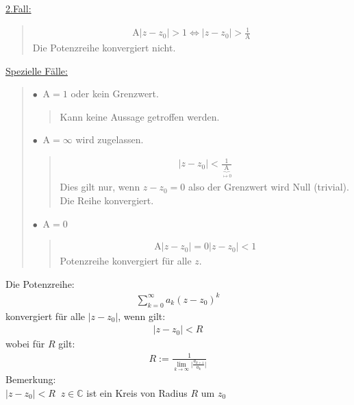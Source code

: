 \underline{2.Fall:}\\
\begin{quote}
	\begin{align*}
		\mathrm{A}|z-z_0|>1\Leftrightarrow |z-z_0|>\frac{1}{\mathrm{A}}
	\end{align*}
	Die Potenzreihe konvergiert nicht.\\
\end{quote}
\underline{Spezielle Fälle:}\\
\begin{quote}
	$\bullet  \;\; \mathrm{A}=1 $ oder kein Grenzwert.\\
	\begin{quote}
		Kann keine Aussage getroffen werden.
	\end{quote}
	$\bullet  \;\; \mathrm{A}=\infty $ wird zugelassen.\\
	\begin{quote}
		\begin{align*}
			|z-z_0|<\frac{1}{\underbrace {\mathrm{A}}_{\mapsto 0}}
		\end{align*}
		Dies gilt nur, wenn $ z-z_0=0 $ also der Grenzwert wird Null (trivial). Die Reihe konvergiert.\\
	\end{quote}
	$\bullet  \;\; \mathrm{A}=0 $
	\begin{quote}
		\begin{align*}
			\mathrm{A}|z-z_0|=0|z-z_0|<1
		\end{align*}
		Potenzreihe konvergiert für alle $ z $.\\
	\end{quote}
\end{quote}
Die Potenzreihe:\\
\begin{align*}
	\sum\limits_{k=0}^{\infty}a_k(z-z_0)^k
\end{align*}
konvergiert für alle $ |z-z_0| $, wenn gilt:\\
\begin{align*}
	|z-z_0|<R
\end{align*}
wobei für $ R $ gilt:\\
\begin{align*}
	R:=\frac{1}{\lim\limits_ {k\to\infty}\bigg|\frac{a_{k+1}}{a_k}\bigg|}
\end{align*}
\newpage
\noindent
Bemerkung:\\
$ |z-z_0|<R\;\;z\in \mathbb{C} $ ist ein Kreis von Radius $ R $ um $ z_0 $\\
